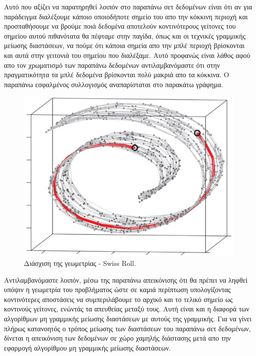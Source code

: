 \vspace{1.0cm}
\par
Αυτό που αξίζει να παρατηρηθεί λοιπόν στο παραπάνω σετ δεδομένων είναι ότι αν για παράδειγμα διαλέξουμε κάποιο οποιοδήποτε σημείο του απο την κόκκινη περιοχή και προσπαθήσουμε να βρούμε ποιά δεδομένα αποτελούν κοντινότερους γείτονες του σημείου αυτού πιθανότατα θα πέφταμε στην παγίδα, όπως και οι τεχνικές γραμμικής μείωσης διαστάσεων, να πούμε ότι κάποια σημεία απο την μπλέ περιοχή βρίσκονται και αυτά στην γειτονιά του σημείου που διαλέξαμε. Αυτό προφανώς είναι λάθος αφού απο τον χρωματισμό των παραπάνω δεδομένων αντιλαμβανόμαστε ότι στην πραγματικότητα τα μπλέ δεδομένα βρίσκονται πολύ μακριά απο τα κόκκινα. Ο παραπάνω εσφαλμένος συλλογισμός αναπαρίσταται στο παρακάτω γράφημα.
\par
\begin{figure}[h!]
\centering
\includegraphics[scale=0.5]{figs/3.png}
\newline
\caption{Διάσχιση της γεωμετρίας - \textlatin{Swiss Roll}.} 
\end{figure}
\par
\vspace*{2cm}
Αντιλαμβανόμαστε λοιπόν, μέσω της παραπάνω απεικόνισης ότι θα πρέπει να ληφθεί υπόψιν η γεωμετρία του προβλήματος ώστε σε καμιά περίπτωση υπολογίζοντας κοντινότερες αποστάσεις να συμπεριλάβουμε το αρχικό και το τελικό σημείο ως κοντινούς γείτονες, ενώντάς τα απευθείας μεταξύ τους. Αυτή είναι και η διαφορά των αλγορίθμων μη γραμμικής μείωσης διαστάσεων με αυτούς της γραμμικής. Για να γίνει πλήρως κατανοητός ο τρόπος μείωσης των διαστάσεων του παραπάνω σετ δεδομένων, δίνεται η απεικόνιση των δεδομένων σε χώρο χαμηλής διάστασης μετά απο την εφαρμογή αλγορίθμου μη γραμμικής μείωσης διαστάσεων.
